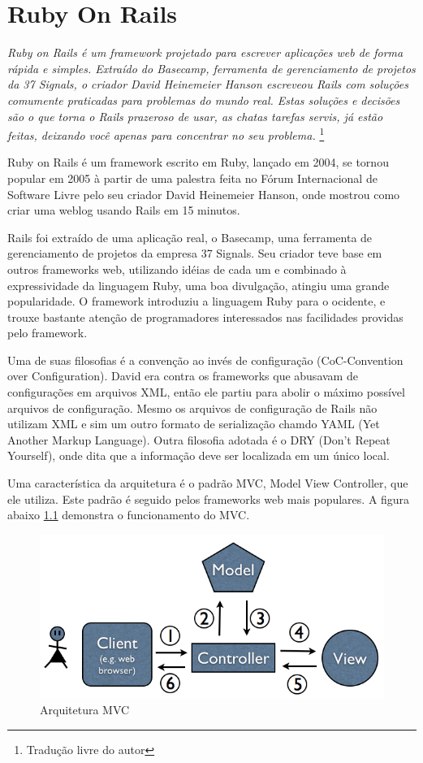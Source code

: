 \chapter{Ruby On Rails}

\emph{Ruby on Rails é um framework projetado para escrever aplicações web de forma rápida e simples. Extraído do Basecamp, ferramenta de gerenciamento de projetos da 37 Signals, o criador David Heinemeier Hanson escreveou Rails com soluções comumente praticadas para problemas do mundo real. Estas soluções e decisões são o que torna o Rails prazeroso de usar, as chatas tarefas servis, já estão feitas, deixando você apenas para concentrar no seu problema.}
\cite{rails_in_nutshell}\footnote{Tradução livre do autor}

Ruby on Rails é um framework escrito em Ruby, lançado em 2004, se tornou popular em 2005 à partir de uma palestra feita no Fórum Internacional de Software Livre pelo seu criador David Heinemeier Hanson, onde mostrou como criar uma weblog usando Rails em 15 minutos. 

Rails foi extraído de uma aplicação real, o Basecamp, uma ferramenta de gerenciamento de projetos da empresa 37 Signals. Seu criador teve base em outros frameworks web, utilizando idéias de cada um e combinado à expressividade da linguagem Ruby, uma boa divulgação, atingiu uma grande popularidade. O framework introduziu a linguagem Ruby para o ocidente, e trouxe bastante atenção de programadores interessados nas facilidades providas pelo framework.

Uma de suas filosofias é a convenção ao invés de configuração (CoC-Convention over Configuration). David era contra os frameworks que abusavam de configurações em arquivos XML, então ele partiu para abolir o máximo possível arquivos de configuração. Mesmo os arquivos de configuração de Rails não utilizam XML e sim um outro formato de serialização chamdo YAML (Yet Another Markup Language). Outra filosofia adotada é o DRY (Don't Repeat Yourself), onde dita que a informação deve ser localizada em um único local.     

Uma característica da arquitetura é o padrão MVC, Model View Controller, que ele utiliza. Este padrão é seguido pelos frameworks web mais populares. A figura abaixo \ref{fig:mvc-diagram} demonstra o funcionamento do MVC.

\begin{figure}[here]
\includegraphics[width=150mm]{images/mvc-diagram.png}
\caption{Arquitetura MVC}
\label{fig:mvc-diagram}
\end{figure}


